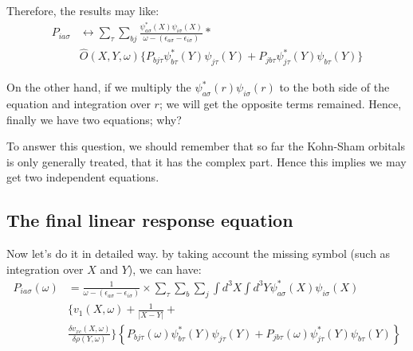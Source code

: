 Therefore, the results may like:
\begin{equation}
\begin{split}
 P_{ia\sigma} &\leftrightarrow 
\sum_{\tau}\sum_{bj}
\frac{\psi_{a\sigma}^{*}(X)
\psi_{i\sigma}(X)}{\omega - (\epsilon_{a\sigma} - \epsilon_{i\sigma})}
* \\
&\hat{O}(X,Y,\omega)
\{P_{bj\tau}\psi^{*}_{b\tau}(Y)\psi_{j\tau}(Y) +
P_{jb\tau}\psi^{*}_{j\tau}(Y)\psi_{b\tau}(Y)\}
\end{split}
\end{equation}

On the other hand, if we multiply the
$\psi^{*}_{a\sigma}(r)\psi_{i\sigma}(r)$ to
the both side of the equation and integration over $r$; we will get
the opposite terms remained. Hence, finally we have two equations;
why?

To answer this question, we should remember that so far the Kohn-Sham
orbitals is only generally treated, that it has the complex part.
Hence this implies we may get two independent equations.

\subsection{The final linear response
equation}\label{TTDFT_ENERGY_TFLRE}
%
%
%
%
Now let's do it in detailed way. by taking account the missing symbol
(such as integration over $X$ and $Y$), we can have:
\begin{equation}
\label{TDDFT_ENERGY_EQUATION_eq:8}
 \begin{split}
P_{ia\sigma}(\omega)&=\frac{1}{\omega -
(\epsilon_{a\sigma} - \epsilon_{i\sigma})}\times
\sum_{\tau}\sum_{b}\sum_{j}\int d^{3}X \int d^{3}Y 
\psi_{a\sigma}^{*}(X)\psi_{i\sigma}(X)\\
&\Bigg\{v_{1}(X,\omega) + \frac{1}{|X-Y|} 
+ \\
&\frac{\delta
v_{xc}(X,\omega)}{\delta
\rho(Y,\omega)}\Bigg\} 
\left\lbrace P_{bj\tau}(\omega)\psi^{*}_{b\tau}(Y)\psi_{j\tau}(Y) +
P_{jb\tau}(\omega)\psi^{*}_{j\tau}(Y)\psi_{b\tau}(Y)\right\rbrace 
\end{split}
\end{equation} 

